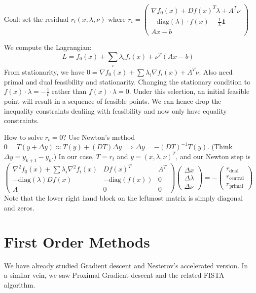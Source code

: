\documentclass[english, 11pt]{article}
\begin{document}
Goal: set the residual $r_t(x,\lambda,\nu)$ where $r_t = \begin{pmatrix} \nabla f_0(x) + D f(x)^T \lambda + A^T \nu \\ - \text{diag}(\lambda) \cdot f(x) - \frac{1}{L} \mathbf{1} \\ Ax -b\end{pmatrix}$

We compute the Lagrangian:
\[
L = f_0(x)+ \sum_i \lambda_i f_i(x) + \nu^T (Ax-b)
\]
From stationarity, we have $0 = \nabla f_0(x) + \sum \lambda_i \nabla f_i(x) + A^T \nu$. Also need primal and dual feasibility and stationarity. Changing the stationary condition to $f(x) \cdot \lambda = - \frac{1}{t}$ rather than $f(x) \cdot \lambda =0$. Under this selection, an initial feasible point will result in a sequence of feasible points. We can hence drop the inequality constraints dealiing with feasibility and now only have equality constraints.

How to solve $r_t=0$? Use Newton's method $0= T(y + \Delta y) \approx T(y) + (DT) \Delta y \implies \Delta y = - (DT)^{-1} T(y).$ (Think $\Delta y = y_{k+1} - y_k$.) In our case, $T = r_t$ and $y = (x, \lambda,\nu)^T$, and our Newton step is
\[
\begin{pmatrix}
\nabla^2 f_0(x) + \sum \lambda_i \nabla^2 f_i(x) & D f(x)^T & A^T \\
- \text{diag}(\lambda) Df(x) & - \text{diag}(f(x)) & 0 \\ 
A & 0 & 0 
\end{pmatrix}
\begin{pmatrix} \Delta x \\ \Delta \lambda \\ \Delta \nu \end{pmatrix}
= 
- \begin{pmatrix}
r_{\text{dual}} \\
r_{\text{central}} \\
r_{\text{primal}}
\end{pmatrix}
\]
Note that the lower right hand block on the leftmost matrix is simply diagonal and zeros.

\section{First Order Methods}
We have already studied Gradient descent and Nesterov's accelerated version. In a similar vein, we saw Proximal Gradient descent and the related FISTA algorithm.
\end{document}
